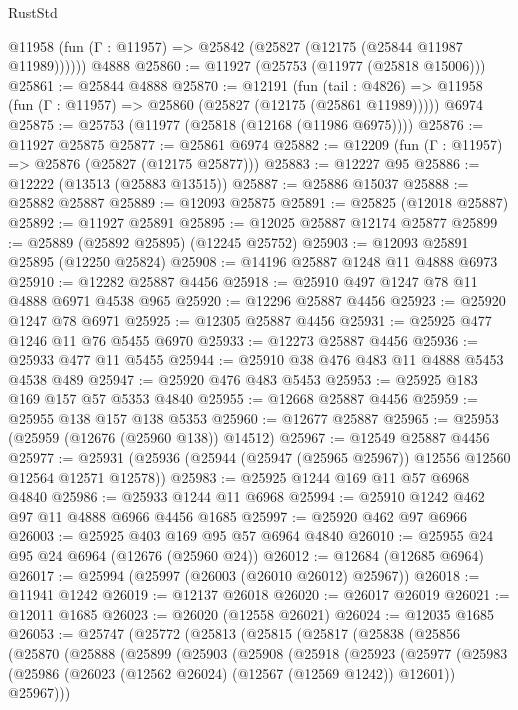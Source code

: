 \begin{lexlean}{RustStd}
\begin{coremodule}
      @11958 (fun (Γ : @11957) => @25842 (@25827 (@12175 (@25844 @11987 @11989))))))
    @4888
@25860 := @11927 (@25753 (@11977 (@25818 @15006)))
@25861 := @25844 @4888
@25870 := @12191
    (fun (tail : @4826) => @11958 (fun (Γ : @11957) => @25860 (@25827 (@12175 (@25861 @11989)))))
    @6974
@25875 := @25753 (@11977 (@25818 (@12168 (@11986 @6975))))
@25876 := @11927 @25875
@25877 := @25861 @6974
@25882 := @12209 (fun (Γ : @11957) => @25876 (@25827 (@12175 @25877)))
@25883 := @12227 @95
@25886 := @12222 (@13513 (@25883 @13515))
@25887 := @25886 @15037
@25888 := @25882 @25887
@25889 := @12093 @25875
@25891 := @25825 (@12018 @25887)
@25892 := @11927 @25891
@25895 := @12025 @25887 @12174 @25877
@25899 := @25889 (@25892 @25895) (@12245 @25752)
@25903 := @12093 @25891 @25895 (@12250 @25824)
@25908 := @14196 @25887 @1248 @11 @4888 @6973
@25910 := @12282 @25887 @4456
@25918 := @25910 @497 @1247 @78 @11 @4888 @6971 @4538 @965
@25920 := @12296 @25887 @4456
@25923 := @25920 @1247 @78 @6971
@25925 := @12305 @25887 @4456
@25931 := @25925 @477 @1246 @11 @76 @5455 @6970
@25933 := @12273 @25887 @4456
@25936 := @25933 @477 @11 @5455
@25944 := @25910 @38 @476 @483 @11 @4888 @5453 @4538 @489
@25947 := @25920 @476 @483 @5453
@25953 := @25925 @183 @169 @157 @57 @5353 @4840
@25955 := @12668 @25887 @4456
@25959 := @25955 @138 @157 @138 @5353
@25960 := @12677 @25887
@25965 := @25953 (@25959 (@12676 (@25960 @138)) @14512)
@25967 := @12549 @25887 @4456
@25977 := @25931 (@25936 (@25944 (@25947 (@25965 @25967)) @12556 @12560 @12564 @12571 @12578))
@25983 := @25925 @1244 @169 @11 @57 @6968 @4840
@25986 := @25933 @1244 @11 @6968
@25994 := @25910 @1242 @462 @97 @11 @4888 @6966 @4456 @1685
@25997 := @25920 @462 @97 @6966
@26003 := @25925 @403 @169 @95 @57 @6964 @4840
@26010 := @25955 @24 @95 @24 @6964 (@12676 (@25960 @24))
@26012 := @12684 (@12685 @6964)
@26017 := @25994 (@25997 (@26003 (@26010 @26012) @25967))
@26018 := @11941 @1242
@26019 := @12137 @26018
@26020 := @26017 @26019
@26021 := @12011 @1685
@26023 := @26020 (@12558 @26021)
@26024 := @12035 @1685
@26053 := @25747
    (@25772
      (@25813
        (@25815
          (@25817
            (@25838
              (@25856
                (@25870
                  (@25888
                    (@25899
                      (@25903
                        (@25908
                          (@25918
                            (@25923
                              (@25977
                                (@25983
                                  (@25986 (@26023 (@12562 @26024) (@12567 (@12569 @1242)) @12601))
                                  @25967)))

\end{coremodule}
\end{lexlean}
